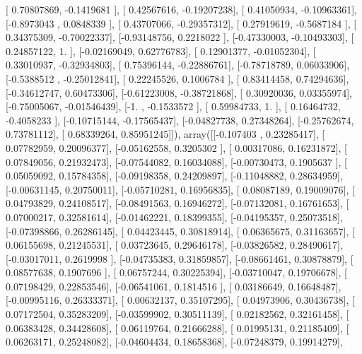 \documentclass{article}
\begin{document}
       [ 0.70807869, -0.1419681 ],
       [ 0.42567616, -0.19207238],
       [ 0.41050934, -0.10963361],
       [-0.8973043 ,  0.0848339 ],
       [ 0.43707066, -0.29357312],
       [ 0.27919619, -0.5687184 ],
       [ 0.34375309, -0.70022337],
       [-0.93148756,  0.2218022 ],
       [-0.47330003, -0.10493303],
       [ 0.24857122,  1.        ],
       [-0.02169049,  0.62776783],
       [ 0.12901377, -0.01052304],
       [ 0.33010937, -0.32934803],
       [ 0.75396144, -0.22886761],
       [-0.78718789,  0.06033906],
       [-0.5388512 , -0.25012841],
       [ 0.22245526,  0.1006784 ],
       [ 0.83414458,  0.74294636],
       [-0.34612747,  0.60473306],
       [-0.61223008, -0.38721868],
       [ 0.30920036,  0.03355974],
       [-0.75005067, -0.01546439],
       [-1.        , -0.1533572 ],
       [ 0.59984733,  1.        ],
       [ 0.16464732, -0.4058233 ],
       [-0.10715144, -0.17565437],
       [-0.04827738,  0.27348264],
       [-0.25762674,  0.73781112],
       [ 0.68339264,  0.85951245]]), array([[-0.107403  ,  0.23285417],
       [ 0.07782959,  0.20096377],
       [-0.05162558,  0.3205302 ],
       [ 0.00317086,  0.16231872],
       [ 0.07849056,  0.21932473],
       [-0.07544082,  0.16034088],
       [-0.00730473,  0.1905637 ],
       [ 0.05059092,  0.15784358],
       [-0.09198358,  0.24209897],
       [-0.11048882,  0.28634959],
       [-0.00631145,  0.20750011],
       [-0.05710281,  0.16956835],
       [ 0.08087189,  0.19009076],
       [ 0.04793829,  0.24108517],
       [-0.08491563,  0.16946272],
       [-0.07132081,  0.16761653],
       [ 0.07000217,  0.32581614],
       [-0.01462221,  0.18399355],
       [-0.04195357,  0.25073518],
       [-0.07398866,  0.26286145],
       [ 0.04423445,  0.30818914],
       [ 0.06365675,  0.31163657],
       [ 0.06155698,  0.21245531],
       [ 0.03723645,  0.29646178],
       [-0.03826582,  0.28490617],
       [-0.03017011,  0.2619998 ],
       [-0.04735383,  0.31859857],
       [-0.08661461,  0.30878879],
       [ 0.08577638,  0.1907696 ],
       [ 0.06757244,  0.30225394],
       [-0.03710047,  0.19706678],
       [ 0.07198429,  0.22853546],
       [-0.06541061,  0.1814516 ],
       [ 0.03186649,  0.16648487],
       [-0.00995116,  0.26333371],
       [ 0.00632137,  0.35107295],
       [ 0.04973906,  0.30436738],
       [ 0.07172504,  0.35283209],
       [-0.03599902,  0.30511139],
       [ 0.02182562,  0.32161458],
       [ 0.06383428,  0.34428608],
       [ 0.06119764,  0.21666288],
       [ 0.01995131,  0.21185409],
       [ 0.06263171,  0.25248082],
       [-0.04604434,  0.18658368],
       [-0.07248379,  0.19914279],
\end{document}
